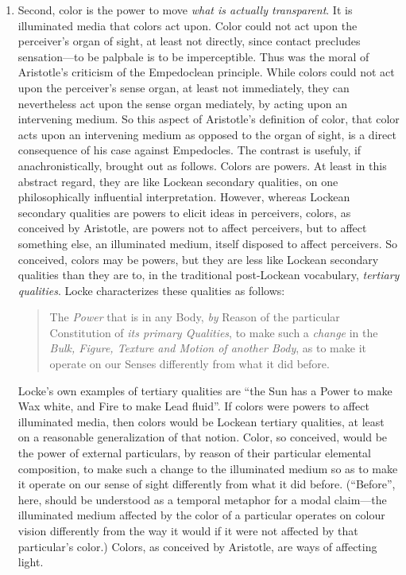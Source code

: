 \begin{enumerate}[(1)]
	\item Second, color is the power to move \emph{what is actually transparent}. It is illuminated media that colors act upon. Color could not act upon the perceiver's organ of sight, at least not directly, since contact precludes sensation---to be palpbale is to be imperceptible. Thus was the moral of Aristotle's criticism of the Empedoclean principle. While colors could not act upon the perceiver's sense organ, at least not immediately, they can nevertheless act upon the sense organ mediately, by acting upon an intervening medium. So this aspect of Aristotle's definition of color, that color acts upon an intervening medium as opposed to the organ of sight, is a direct consequence of his case against Empedocles. The contrast is usefuly, if anachronistically, brought out as follows. Colors are powers. At least in this abstract regard, they are like Lockean secondary qualities, on one philosophically influential interpretation. However, whereas Lockean secondary qualities are powers to elicit ideas in perceivers, colors, as conceived by Aristotle, are powers not to affect perceivers, but to affect something else, an illuminated medium, itself disposed to affect perceivers. So conceived, colors may be powers, but they are less like Lockean secondary qualities than they are to, in the traditional post-Lockean vocabulary, \emph{tertiary qualities}. Locke characterizes these qualities as follows: 
\begin{quote}
	The \emph{Power} that is in any Body, \emph{by} Reason of the particular Constitution of \emph{its primary Qualities}, to make such a \emph{change} in the \emph{Bulk, Figure, Texture and Motion of another Body}, as to make it operate on our Senses differently from what it did before. \citep[2.8.23]{Locke:1706hc} 
\end{quote}
Locke's \citeyearpar[2.8.23]{Locke:1706hc} own examples of tertiary qualities are ``the Sun has a Power to make Wax white, and Fire to make Lead fluid''. If colors were powers to affect illuminated media, then colors would be Lockean tertiary qualities, at least on a reasonable generalization of that notion. Color, so conceived, would be the power of external particulars, by reason of their particular elemental composition, to make such a change to the illuminated medium so as to make it operate on our sense of sight differently from what it did before. (``Before'', here, should be understood as a temporal metaphor for a modal claim---the illuminated medium affected by the color of a particular operates on colour vision differently from the way it would if it were not affected by that particular's color.) Colors, as conceived by Aristotle, are ways of affecting light.

\end{enumerate}

